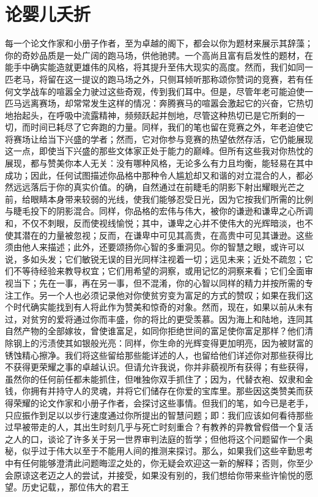 
\chapter{论婴儿夭折}


每一个论文作家和小册子作者，至为卓越的阁下，都会以你为题材来展示其辞藻；你的奇妙品质是一处广阔的跑马场，供他驰骋。一个高尚且富有启发性的题材，在能手中确实能造就更雄伟的风格，将其提升至伟大现实的高度。然而，我们如同一匹老马，将留在这一提议的跑马场之外，只侧耳倾听那称颂你赞词的竞赛，若有任何文学战车的喧嚣全力驶过这些奇观，传到我们耳中。但是，尽管年老可能迫使一匹马远离赛场，却常常发生这样的情况：奔腾赛马的喧嚣会激起它的兴奋，它热切地抬起头，在呼吸中流露精神，频频跃起并刨地，尽管这种热切已是它所剩的一切，而时间已耗尽了它奔跑的力量。同样，我们的笔也留在竞赛之外，年老迫使它将赛场让给当下兴盛的学者；然而，它对你参与竞赛的热望依然存活，它仍能展现这一点，即使当下兴盛的那些文体家正处于能力的巅峰。但所有这些我对你热忱的展现，都与赞美你本人无关：没有哪种风格，无论多么有力且均衡，能轻易在其中成功；因此，任何试图描述你品格中那种令人尴尬却又和谐的对立混合的人，都必然远远落后于你的真实价值。的确，自然通过在前睫毛的阴影下射出耀眼光芒之前，给眼睛本身带来较弱的光线，使我们能够忍受日光，因为它按我们所需的比例与睫毛投下的阴影混合。同样，你品格的宏伟与伟大，被你的谦逊和谦卑之心所调和，不仅不刺眼，反而使视线愉悦；其中，谦卑之心并不使伟大的光辉暗淡，也不使其潜在的力量被忽视；反而，在谦卑中可见其高贵，在高贵中可见其谦逊。这些须由他人来描述；此外，还要颂扬你心智的多重洞见。你的智慧之眼，或许可以说，多如头发；它们敏锐无误的目光同样注视着一切；远见未来；近处不疏忽；它们不等待经验来教导权宜；它们用希望的洞察，或用记忆的洞察来看；它们全面审视当下；先在一事，再在另一事，但不混淆，你的心智以同样的精力并按所需的专注工作。另一个人也必须记录他对你使贫穷变为富足的方式的赞叹；如果在我们这个时代确实能找到有人将此作为赞美和惊奇的对象。然而，现在，如果以前从未有过，对贫穷的爱将通过你而丰盛，你的将比的更受羡慕。因为海上和陆地，连同其自然产物的全部嫁妆，曾使谁富足，如同你拒绝世间的富足使你富足那样？他们清除钢上的污渍使其如银般光亮：同样，你生命的光辉变得更加明亮，因为被财富的锈蚀精心擦净。我们将这些留给那些能详述的人，也留给他们详述你对那些获得比不获得更荣耀之事的卓越认识。但请允许我说，你并非藐视所有获得；有些获得，虽然你的任何前任都未能抓住，但唯独你双手抓住了；因为，代替衣袍、奴隶和金钱，你拥有并持守人的灵魂，并将它们储存在你爱的宝库里。那些因这类赞美而获得荣耀的论文作家和小册子作者，会探讨这些事情。但我们的笔，如今已是老手，只应振作到足以以步行速度通过你所提出的智慧问题；即：我们应该如何看待那些过早被带走的人，其出生时刻几乎与死亡时刻重合？有教养的异教曾假借一个复活之人的口，谈论了许多关于另一世界审判法庭的哲学；但他将这个问题留作一个奥秘，似乎过于伟大以至于不能用人间的推测来探讨。那么，如果我们这些辛勤思考中有任何能够澄清此问题晦涩之处的，你无疑会欢迎这一新的解释；否则，你至少会原谅这老迈之人的尝试，并接受，如果没有别的，我们想给你带来些许愉悦的愿望。历史记载，，那位伟大的君王